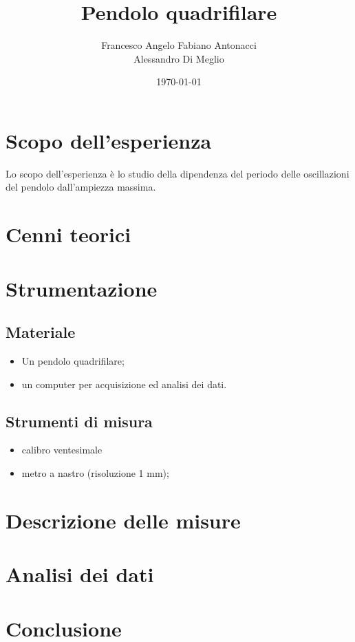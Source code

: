 \documentclass{article}
\title{Pendolo quadrifilare}
\author{Francesco Angelo Fabiano Antonacci \\ Alessandro Di Meglio}
\date{\today}
\begin{document}
\maketitle
\section{Scopo dell'esperienza}
Lo scopo dell'esperienza è lo studio della dipendenza del periodo delle oscillazioni del pendolo dall'ampiezza massima.
\section{Cenni teorici}



\section{Strumentazione}

\subsection{Materiale}

\begin{itemize}
\item  Un pendolo quadrifilare;
\item  un computer per acquisizione ed analisi dei dati.
\end{itemize}

\subsection{Strumenti di misura}

\begin{itemize}
\item  calibro  ventesimale
\item  metro a nastro (risoluzione 1 mm);
\end{itemize}

\section{Descrizione delle misure}
\section{Analisi dei dati}
\section{Conclusione}
\end{document}
